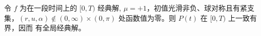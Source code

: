 






\begin{theorem}
    令 $f$ 为\eqrvp 在一段时间上的 $[0, T)$ 经典解, $\mu=+1$，初值光滑非负、球对称且有紧支集，$(r, u, \alpha) \notin(0, \infty) \times(0, \pi) $ 处函数值为零。则 $P(t)$ 在 $[0, T)$ 上一致有界，因而 \eqrvp 有全局经典解。
\end{theorem}
    

